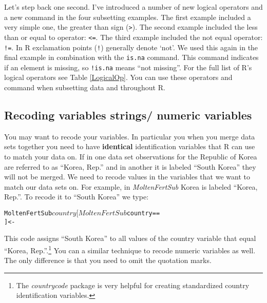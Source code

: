 Let's step back one second. I've introduced a number of new logical operators and a new command in the four subsetting examples. The first example included a very simple one, the greater than sign (\verb|>|). The second example included the less than or equal to operator: \verb|<=|. The third example included the not equal operator: \verb|!=|. In R exclamation points (\verb|!|) generally denote `not'. We used this again in the final example in combination with the \texttt{is.na} command. This command indicates if an element is missing, so \verb|!is.na| means ``not missing''. For the full list of R's logical operators see Table \ref{LogicalOp}. You can use these operators and command when subsetting data and throughout R.

\subsection{Recoding variables strings/ numeric variables}

You may want to recode your variables. In particular you when you merge data sets together you need to have \textbf{identical} identification variables that R can use to match your data on. If in one data set observations for the Republic of Korea are referred to as ``Korea, Rep.'' and in another it is labeled ``South Korea'' they will not be merged. We need to recode values in the variables that we want to match our data sets on. For example, in \emph{MoltenFertSub} Korea is labeled ``Korea, Rep.''. To recode it to ``South Korea'' we type:

\begin{knitrout}
\color{fgcolor}\begin{kframe}
\begin{alltt}
MoltenFertSub$country[MoltenFertSub$country == 
                        ] <- 
\end{alltt}
\end{kframe}
\end{knitrout}


\noindent This code assigns ``South Korea'' to all values of the country variable that equal ``Korea, Rep.''.\footnote{The \emph{countrycode} package \citep{R-countrycode} is very helpful for creating standardized country identification variables.} You can a similar technique to recode numeric variables as well. The only difference is that you need to omit the quotation marks.

